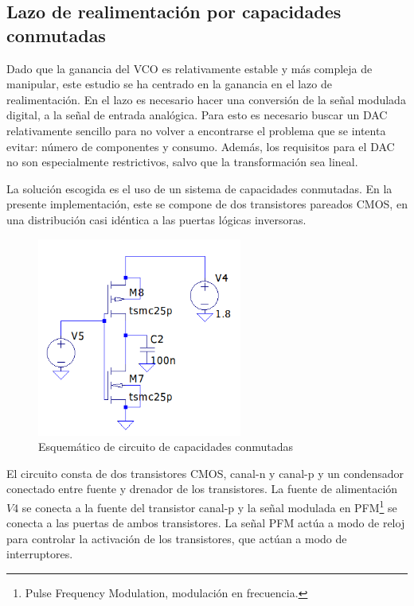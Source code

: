 \documentclass[12pt]{report} %
\begin{document}
	\subsection{Lazo de realimentación por capacidades conmutadas}
	
	Dado que la ganancia del VCO es relativamente estable y más compleja de manipular, este estudio se ha centrado en la ganancia en el lazo de realimentación. En el lazo es necesario hacer una conversión de la señal modulada digital, a la señal de entrada analógica. Para esto es necesario buscar un DAC relativamente sencillo para no volver a encontrarse el problema que se intenta evitar: número de componentes y consumo. Además, los requisitos para el DAC no son especialmente restrictivos, salvo que la transformación sea lineal.
	
	La solución escogida es el uso de un sistema de capacidades conmutadas. En la presente implementación, este se compone de dos transistores pareados CMOS, en una distribución casi idéntica a las puertas lógicas inversoras.
	
	\begin{figure}[H]
		\includegraphics[width=0.6\textwidth]{sw-capacities-sch.png}
		\caption[Esquemático de circuito de capacidades conmutadas]{Esquemático de circuito de capacidades conmutadas}
		\label{fig:sw-capacities-sch.png}
	\end{figure}
	
	El circuito consta de dos transistores CMOS, canal-n y canal-p y un condensador conectado entre fuente y drenador de los transistores. La fuente de alimentación $V4$ se conecta a la fuente del transistor canal-p y la señal modulada en PFM\footnote{Pulse Frequency Modulation, modulación en frecuencia.} se conecta a las puertas de ambos transistores. La señal PFM actúa a modo de reloj para controlar la activación de los transistores, que actúan a modo de interruptores.
	
\end{document}
